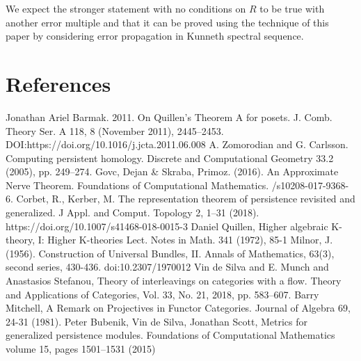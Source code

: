 \documentclass[a4paper, 12pt]{article}
\numberwithin{equation}{section}
\theoremstyle{definition}
\theoremstyle{remark}
\begin{document}
We expect the stronger statement with no conditions on $R$ to be true with another error multiple and that it can be proved using the technique of this paper by considering error propagation in Kunneth spectral sequence.

\section{References}

\begin{enumerate}
  Jonathan Ariel Barmak. 2011.
  \newblock On Quillen’s Theorem A for posets.
  \newblock J. Comb. Theory Ser. A 118, 8 (November 2011), 2445–2453.
  \newblock DOI:https://doi.org/10.1016/j.jcta.2011.06.008
  A. Zomorodian and G. Carlsson.
  \newblock Computing persistent homology.
  \newblock Discrete and Computational Geometry 33.2 (2005), pp. 249–274.
  Govc, Dejan \& Skraba, Primoz. (2016).
  \newblock An Approximate Nerve Theorem.
  \newblock Foundations of Computational Mathematics.
  /s10208-017-9368-6.
  Corbet, R., Kerber, M.
  \newblock The representation theorem of persistence revisited and generalized.
  \newblock J Appl. and Comput. Topology 2, 1–31 (2018).
  \newblock https://doi.org/10.1007/s41468-018-0015-3
  Daniel Quillen,
  \newblock Higher algebraic K-theory, I: Higher K-theories Lect.
  \newblock Notes in Math. 341 (1972), 85-1
  Milnor, J. (1956).
  \newblock Construction of Universal Bundles, II.
  \newblock Annals of Mathematics, 63(3), second series, 430-436.
  \newblock doi:10.2307/1970012
  Vin de Silva and E. Munch and Anastasios Stefanou,
  \newblock Theory of interleavings on categories with a flow.
  \newblock Theory and Applications of Categories, Vol. 33, No. 21, 2018, pp. 583–607.
  Barry Mitchell,
  \newblock A Remark on Projectives in Functor Categories.
  \newblock Journal of Algebra 69, 24-31 (1981).
  Peter Bubenik, Vin de Silva, Jonathan Scott,
  \newblock Metrics for generalized persistence modules.
  \newblock Foundations of Computational Mathematics volume 15, pages 1501–1531 (2015)
\end{enumerate}
\end{document}
